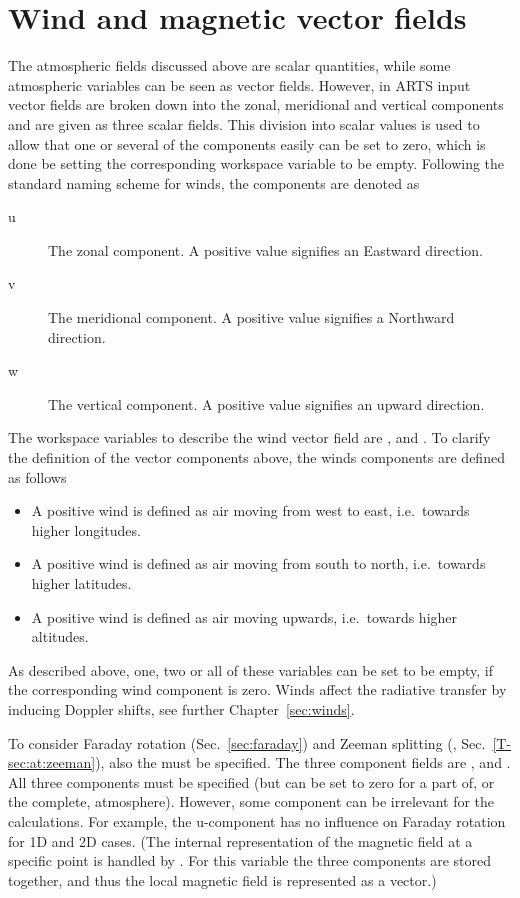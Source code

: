 \section{Wind and magnetic vector fields}
\label{sec:atm:vecfields}
%
The atmospheric fields discussed above are scalar quantities, while some
atmospheric variables can be seen as vector fields. However, in ARTS input
vector fields are broken down into the zonal, meridional and vertical
components and are given as three scalar fields. This division into scalar
values is used to allow that one or several of the components easily can be set
to zero, which is done be setting the corresponding workspace variable to be
empty. Following the standard naming scheme for winds, the components are
denoted as
\begin{description}
\item[u] The zonal component. A positive value signifies an Eastward direction.
\item[v] The meridional component. A positive value signifies a Northward
  direction.
\item[w] The vertical component. A positive value signifies an upward
  direction.
\end{description}
The workspace variables to describe the wind vector field are
,  and
. To clarify the definition of the vector components
above, the winds components are defined as follows
\begin{itemize}
\item[\WindWE] A positive wind is defined as air moving
  from west to east, i.e.\ towards higher longitudes.
\item[\WindSN] A positive wind is defined as air
  moving from south to north, i.e.\ towards higher latitudes.
\item[\WindVe] A positive wind is defined as air
  moving upwards, i.e.\ towards higher altitudes.
\end{itemize}
As described above, one, two or all of these variables can be set to be empty,
if the corresponding wind component is zero. Winds affect the radiative
transfer by inducing Doppler shifts, see further Chapter~\ref{sec:winds}.


To consider Faraday rotation (Sec.~\ref{sec:faraday}) and Zeeman splitting
(\theory, Sec.~\ref{T-sec:at:zeeman}), also the  must
be specified. The three component fields are ,
 and . All three components
must be specified (but can be set to zero for a part of, or the complete,
atmosphere). However, some component can be irrelevant for the calculations.
For example, the u-component has no influence on Faraday rotation for 1D and 2D
cases. (The internal representation of the magnetic field at a specific point
is handled by . For this variable the three components are
stored together, and thus the local magnetic field is represented as a vector.)




